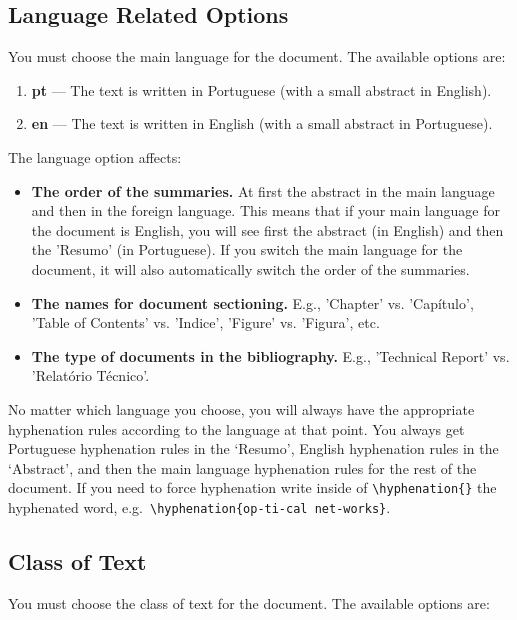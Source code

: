 \subsection{Language Related Options}
\label{sub:language_related_options}

You must choose the main language for the document. The available options are:

\begin{enumerate}
    \item \textbf{pt} --- The text is written in Portuguese (with a small abstract in English).
    \item \textbf{en} --- The text is written in English (with a small abstract in Portuguese).
\end{enumerate}

The language option affects:
\begin{itemize}
    \item \textbf{The order of the summaries.} At first the abstract in the main language and then in the foreign language. This means that if your main language for the document is English, you will see first the abstract (in English) and then the 'Resumo' (in Portuguese). If you switch the main language for the document, it will also automatically switch the order of the summaries.
    \item \textbf{The names for document sectioning.} E.g., 'Chapter' vs. 'Capítulo', 'Table of Contents' vs. 'Indice', 'Figure' vs. 'Figura', etc.
    \item \textbf{The type of documents in the bibliography.} E.g., 'Technical Report' vs. 'Relatório Técnico'.
\end{itemize}

No matter which language you choose, you will always have the appropriate hyphenation rules according to the language at that point. You always get Portuguese hyphenation rules in the `Resumo', English hyphenation rules in the `Abstract', and then the main language hyphenation rules for the rest of the document. If you need to force hyphenation write inside of \verb!\hyphenation{}! the hyphenated word, e.g.\ \verb!\hyphenation{op-ti-cal net-works}!.

\subsection{Class of Text}
\label{sub:class_of_text}

You must choose the class of text for the document. The available options are:

